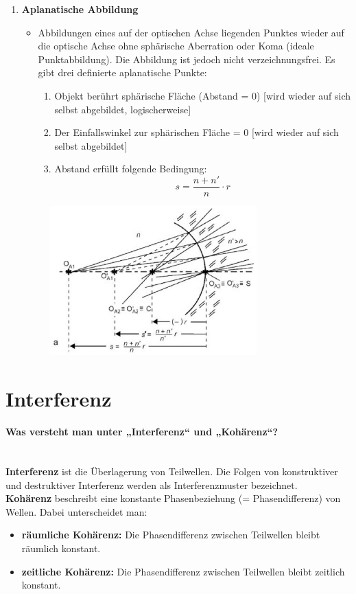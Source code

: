 \documentclass[a4paper, 11pt, ngerman, parskip=half-]{scrartcl}
\newcommand{\myparagraph}[1]{\paragraph{#1}\mbox{}\\}
\begin{document}
\begin{enumerate}
    \item \textbf{Aplanatische Abbildung}
          \begin{itemize}
              \item Abbildungen eines auf der optischen Achse liegenden Punktes wieder auf die optische Achse ohne sphärische Aberration
                    oder Koma (ideale Punktabbildung). Die Abbildung ist jedoch nicht verzeichnungsfrei. Es gibt drei definierte aplanatische Punkte:
                    \begin{enumerate}
                        \item Objekt berührt sphärische Fläche (Abstand = 0) [wird wieder auf sich selbst abgebildet, logischerweise]
                        \item Der Einfallswinkel zur sphärischen Fläche = 0 [wird wieder auf sich selbst abgebildet]
                        \item Abstand erfüllt folgende Bedingung:
                              \[s = \frac{n + n'}{n} \cdot r\]
                    \end{enumerate}
          \end{itemize}
          \begin{figure}[H]
              \centering
              \includegraphics[width=8cm]{image/18/fehler_aplanatisch.png}
          \end{figure}

\end{enumerate}

\newpage


\newpage
\section{Interferenz}

\myparagraph{Was versteht man unter „Interferenz“ und „Kohärenz“?}

\textbf{Interferenz} ist die Überlagerung von Teilwellen. Die Folgen von konstruktiver und destruktiver Interferenz werden als Interferenzmuster bezeichnet.\\
\textbf{Kohärenz} beschreibt eine konstante Phasenbeziehung (= Phasendifferenz) von Wellen. Dabei unterscheidet man:
\begin{itemize}
    \item \textbf{räumliche Kohärenz:} Die Phasendifferenz zwischen Teilwellen bleibt räumlich konstant.
    \item \textbf{zeitliche Kohärenz:} Die Phasendifferenz zwischen Teilwellen bleibt zeitlich konstant.
\end{itemize}
\end{document}
